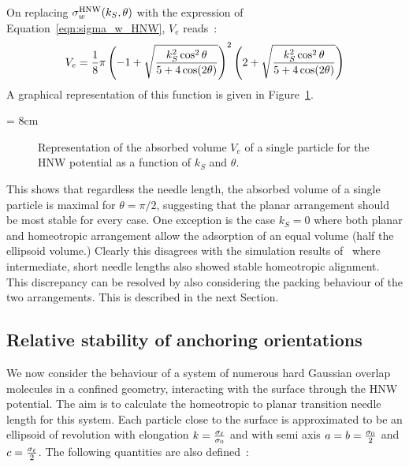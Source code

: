 On replacing $\sigma^{\mathrm{HNW}}_w(k_S,\theta)$ with the expression of
Equation~\ref{eqn:sigma_w_HNW}, $V_e$ reads~:
\begin{equation}
	V_e = \frac{1}{8}\pi
	\left(-1+\sqrt{\frac{k_S^2\cos^2\theta}{5+4\cos(2\theta)}}\right)^2
	\left(2+\sqrt{\frac{k_S^2\cos^2\theta}{5+4\cos(2\theta)}}\right)
\end{equation}
A graphical representation of this function is given in Figure~\ref{fig:Ve_HNW}. 

\picW = 8cm
\begin{figure}
	\centering
	\caption{Representation of the absorbed volume $V_e$ of a single particle 
	for the HNW potential as a function of $k_S$ and $\theta$.}
	\label{fig:Ve_HNW}
\end{figure}

This shows that regardless the needle length, the absorbed volume of a single particle is maximal 
for $\theta=\pi/2$,
suggesting that the planar arrangement should be most stable for every case. One exception is the
case $k_S=0$ where both planar and homeotropic arrangement allow the adsorption of an equal
volume (half the ellipsoid volume.)
Clearly this disagrees with the simulation results of~\cite{Chrzanowska_Teixera_01,Cleaver_Teixeira_01} 
where intermediate, short needle lengths
also showed stable homeotropic alignment. This discrepancy can be resolved by also considering
the packing behaviour of the two arrangements. This is described in the next Section.




\subsection{Relative stability of anchoring orientations}
\label{ss:PHstability}

We now consider the behaviour of
a system of numerous hard Gaussian overlap molecules in a confined geometry, interacting with 
the surface through the HNW potential. The aim is to calculate the homeotropic to
planar transition needle length for this system. Each particle close to the surface is 
approximated to be an ellipsoid of revolution with elongation $k=\frac{\sigma_\ell}{\sigma_0}$ and 
with semi axis $a=b=\frac{\sigma_0}{2}$ and $c=\frac{\sigma_\ell}{2}$. The following quantities are also
defined~:

